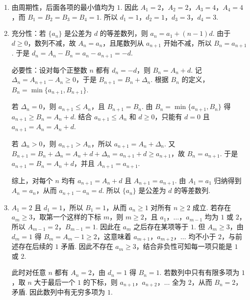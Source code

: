 \begin{solution}
\begin{enumerate}
\item 由周期性，后面各项的最小值均为 \(1\). 因此 \(A_1=2\)，\(A_2=2\)，\(A_3=4\)，\(A_4=4\)，而 \(B_1=B_2=B_3=B_4=1\). 所以
\(d_1=1\)，\(d_2=1\)，\(d_3=3\)，\(d_4=3\).

\item 充分性：若 \(\{a_n\}\) 是公差为 \(d\) 的等差数列，则 \(a_n=a_1+(n-1)d\). 由于 \(d\geqslant0\)，数列不减，故 \(A_n=a_n\)，且尾数列从 \(a_{n+1}\) 开始不减，所以 \(B_n=a_{n+1}\). 于是
\(d_n=A_n-B_n=a_n-a_{n+1}=-d\).

必要性：设对每个正整数 \(n\) 都有 \(d_n=-d\)，则 \(B_n=A_n+d\). 记
\(\Delta_n=A_{n+1}-A_n\geqslant0\)，于是 \(B_{n+1}=B_n+\Delta_n\). 根据 \(B_n\) 的定义，
\(B_n=\min\{a_{n+1},B_{n+1}\}\).

若 \(\Delta_n=0\)，则 \(a_{n+1}\leqslant A_n\)，且 \(B_{n+1}=B_n\). 由 \(B_n=\min\{a_{n+1},B_n\}\) 得 \(a_{n+1}\geqslant B_n=A_n+d\). 结合 \(a_{n+1}\leqslant A_n\) 和 \(d\geqslant0\)，只能有 \(d=0\) 且 \(a_{n+1}=A_n=A_n+d\).

若 \(\Delta_n>0\)，则 \(a_{n+1}>A_n\)，所以 \(a_{n+1}=A_n+\Delta_n\). 又
\(B_{n+1}=B_n+\Delta_n=A_n+d+\Delta_n=a_{n+1}+d\geqslant a_{n+1}\)，故 \(B_n=a_{n+1}\). 于是 \(a_{n+1}=B_n=A_n+d\)，并且 \(A_{n+1}=a_{n+1}\).

综上，对每个 \(n\) 均有 \(a_{n+1}=A_n+d\) 且 \(A_{n+1}=a_{n+1}\). 由 \(A_1=a_1\) 归纳得到 \(A_n=a_n\)，从而 \(a_{n+1}-a_n=d\). 所以 \(\{a_n\}\) 是公差为 \(d\) 的等差数列.

\item \(A_1=2\) 且 \(d_1=1\)，所以 \(B_1=1\)，从而 \(a_n\geqslant1\) 对所有 \(n\geqslant2\) 成立. 若存在 \(a_m\geqslant3\)，取第一个这样的下标 \(m\)，则 \(m\geqslant2\)，且 \(a_1\)，\(\ldots\)，\(a_{m-1}\) 均为 \(1\) 或 \(2\)，所以 \(A_{m-1}=2\)，\(B_{m-1}=1\). 因此在 \(a_m\) 之后存在某项等于 \(1\). 但 \(A_m\geqslant3\)，由 \(d_m=1\) 得 \(B_m=A_m-1\geqslant2\)，这意味着 \(a_{m+1}\)，\(a_{m+2}\)，\(\ldots\) 均不小于 \(2\)，与前述存在后续的 \(1\) 矛盾. 因此不存在 \(a_m\geqslant3\)，结合非负性可知每一项只能是 \(1\) 或 \(2\).

此时对任意 \(n\) 都有 \(A_n=2\)，由 \(d_n=1\) 得 \(B_n=1\). 若数列中只有有限多项为 \(1\)，取 \(n\) 大于最后一个 \(1\) 的下标，则 \(a_{n+1}\)，\(a_{n+2}\)，\(\ldots\) 全为 \(2\)，从而 \(B_n=2\)，矛盾. 因此数列中有无穷多项为 \(1\).
\end{enumerate}
\end{solution}
